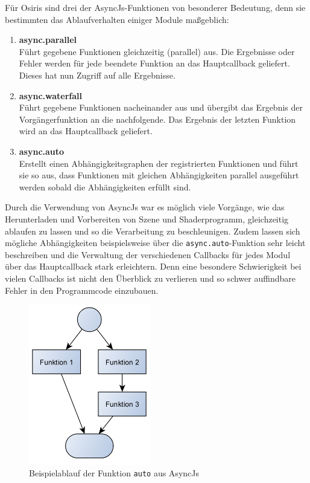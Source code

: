 Für Osiris sind drei der AsyncJs-Funktionen von besonderer Bedeutung, denn sie bestimmten das Ablaufverhalten einiger Module maßgeblich:
\begin{enumerate}
    \item \textbf{async.parallel}\\
Führt gegebene Funktionen gleichzeitig (parallel) aus. Die Ergebnisse oder Fehler werden für jede beendete Funktion an das Hauptcallback geliefert. Dieses hat nun Zugriff auf alle Ergebnisse.
    \item \textbf{async.waterfall}\\
Führt gegebene Funktionen nacheinander aus und übergibt das Ergebnis der Vorgängerfunktion an die nachfolgende. Das Ergebnis der letzten Funktion wird an das Hauptcallback geliefert.
    \item \textbf{async.auto}\\
Erstellt einen Abhängigkeitsgraphen der registrierten Funktionen und führt sie so aus, dass Funktionen mit gleichen Abhängigkeiten parallel ausgeführt werden sobald die Abhängigkeiten erfüllt sind.
\end{enumerate}
Durch die Verwendung von AsyncJs war es möglich viele Vorgänge, wie das Herunterladen und Vorbereiten von Szene und Shaderprogramm, gleichzeitig ablaufen zu lassen und so die Verarbeitung zu beschleunigen. Zudem lassen sich mögliche Abhängigkeiten beispielsweise über die \texttt{async.auto}-Funktion sehr leicht beschreiben und die Verwaltung der verschiedenen Callbacks für jedes Modul über das Hauptcallback stark erleichtern. Denn eine besondere Schwierigkeit bei vielen Callbacks ist nicht den Überblick zu verlieren und so schwer auffindbare Fehler in den Programmcode einzubauen.
\begin{figure}
\centering
\includegraphics[height=70mm]{bilder/asyncauto.png}
\caption{Beispielablauf der Funktion \texttt{auto} aus AsyncJs}
\label{fig:asyncauto}
\end{figure}
